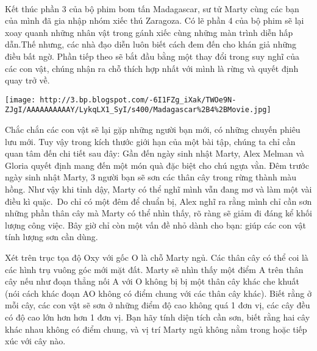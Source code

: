  

Kết thúc phần 3 của bộ phim bom tấn Madagascar, sư tử Marty cùng các bạn của mình đã gia nhập nhóm xiếc thú Zaragoza. Có lẽ phần 4 của bộ phim sẽ lại xoay quanh những nhân vật trong gánh xiếc cùng những màn trình diễn hấp dẫn.Thế nhưng, các nhà đạo diễn luôn biết cách đem đến cho khán giả những điều bất ngờ. Phần tiếp theo sẽ bắt đầu bằng một thay đổi trong suy nghĩ của các con vật, chúng nhận ra chỗ thích hợp nhất với mình là rừng và quyết định quay trở về.


\texttt{[image: http://3.bp.blogspot.com/-6I1FZg\_iXak/TWOe9N-ZJgI/AAAAAAAAAAY/LykqLX1\_SyI/s400/Madagascar\%2B4\%2BMovie.jpg]}

Chắc chắn các con vật sẽ lại gặp những người bạn mới, có những chuyến phiêu lưu mới. Tuy vậy trong kích thước giới hạn của một bài tập, chúng ta chỉ cần quan tâm đến chi tiết sau đây: Gần đến ngày sinh nhật Marty, Alex Melman và Gloria quyết định mang đến một món quà đặc biệt cho chú ngựa vằn. Đêm trước ngày sinh nhật Marty, 3 người bạn sẽ sơn các thân cây trong rừng thành màu hồng. Như vậy khi tỉnh dậy, Marty có thể nghĩ mình vẫn đang mơ và làm một vài điều kì quặc. Do chỉ có một đêm để chuẩn bị, Alex nghĩ ra rằng mình chỉ cần sơn những phần thân cây mà Marty có thể nhìn thấy, rõ ràng sẽ giảm đi đáng kể khối lượng công việc. Bây giờ chỉ còn một vấn đề nhỏ dành cho bạn: giúp các con vật tính lượng sơn cần dùng.

Xét trên trục tọa độ Oxy với gốc O là chỗ Marty ngủ. Các thân cây có thể coi là các hình trụ vuông góc mới mặt đất. Marty sẽ nhìn thấy một điểm A trên thân cây nếu như đoạn thẳng nối A với O không bị bị một thân cây khác che khuất (nói cách khác đoạn AO không có điểm chung với các thân cây khác). Biết rằng ở mỗi cây, các con vật sẽ sơn ở những điểm độ cao không quá 1 đơn vị, các cây đều có độ cao lớn hơn hơn 1 đơn vị. Bạn hãy tính diện tích cần sơn, biết rằng hai cây khác nhau không có điểm chung, và vị trí Marty ngủ không nằm trong hoặc tiếp xúc với cây nào.

\